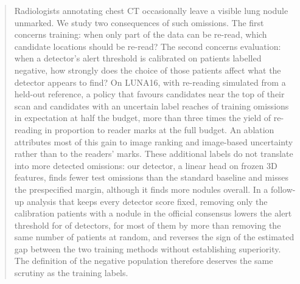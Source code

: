 \begin{abstract}
Radiologists annotating chest CT occasionally leave a visible lung nodule unmarked. We study two consequences of such omissions. The first concerns training: when only part of the data can be re-read, which candidate locations should be re-read? The second concerns evaluation: when a detector's alert threshold is calibrated on patients labelled negative, how strongly does the choice of those patients affect what the detector appears to find? On LUNA16, with re-reading simulated from a held-out reference, a policy that favours candidates near the top of their scan and candidates with an uncertain label reaches \ReachPairRound{} of \NOmitTrain{} training omissions in expectation at half the budget, more than three times the yield of re-reading in proportion to reader marks at the full budget. An ablation attributes most of this gain to image ranking and image-based uncertainty rather than to the readers' marks. These additional labels do not translate into more detected omissions: our detector, a linear head on frozen 3D features, finds fewer test omissions than the standard baseline and misses the prespecified margin, although it finds more nodules overall. In a follow-up analysis that keeps every detector score fixed, removing only the \NExcluded{} calibration patients with a nodule in the official consensus lowers the alert threshold for \LowerHeads{} of \NHeads{} detectors, for most of them by more than removing the same number of patients at random, and reverses the sign of the estimated gap between the two training methods without establishing superiority. The definition of the negative population therefore deserves the same scrutiny as the training labels.
\end{abstract}

